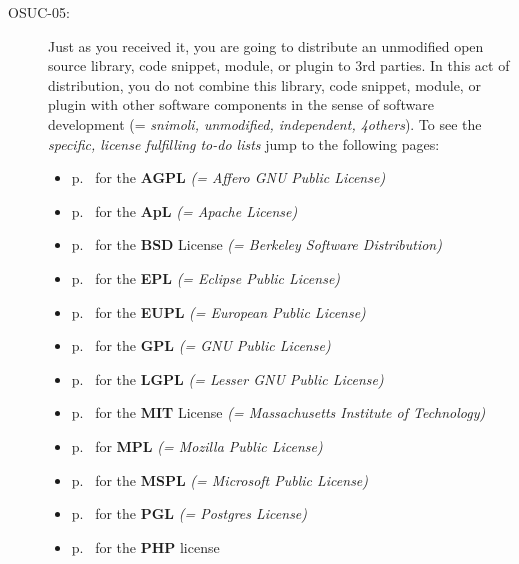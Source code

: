 \begin{description}
\item[OSUC-05:]\label{OSUC-05-DEF} Just as you received it, you are going to
distribute an unmodified open source library, code snippet, module, or plugin to
3rd parties. In this act of distribution, you do not combine this library, code
snippet, module, or plugin with other software components in the sense of
software development (= \textit{snimoli, unmodified, independent, 4others}).
To see the \textit{specific, license fulfilling to-do lists} jump to the
following pages:
  \begin{itemize}
    \item p.\ \pageref{OSUC-05-AGPL} for the \textbf{AGPL}
      \textit{(= Affero GNU Public License)} 
    \item p.\ \pageref{OSUC-05-Apache20} for the \textbf{ApL}
      \textit{(= Apache License)}
    \item p.\ \pageref{OSUC-05-BSD} for the \textbf{BSD} License
      \textit{(= Berkeley Software Distribution)}
    \item p.\ \pageref{OSUC-05-EPL} for the \textbf{EPL}
      \textit{(= Eclipse Public License)}     
    \item p.\ \pageref{OSUC-05-EUPL} for the \textbf{EUPL}
      \textit{(= European Public License)} 
    \item p.\ \pageref{OSUC-05-GPL} for the \textbf{GPL}
       \textit{(= GNU Public License)} 
    \item p.\ \pageref{OSUC-05-LGPL} for the \textbf{LGPL}
      \textit{(= Lesser GNU Public License)}           
    \item p.\ \pageref{OSUC-05-MIT} for the \textbf{MIT} License
       \textit{(= Massachusetts Institute of Technology)} 
    \item p.\ \pageref{OSUC-05-MPL} for \textbf{MPL}
      \textit{(= Mozilla Public License)}     
    \item p.\ \pageref{OSUC-05-MsPL} for the \textbf{MSPL}
      \textit{(= Microsoft Public License)} 
    \item p.\ \pageref{OSUC-05-PGL} for the \textbf{PGL}
      \textit{(= Postgres License)} 
    \item p.\ \pageref{OSUC-05-PHP} for the \textbf{PHP} license 
  \end{itemize}


\end{description}
